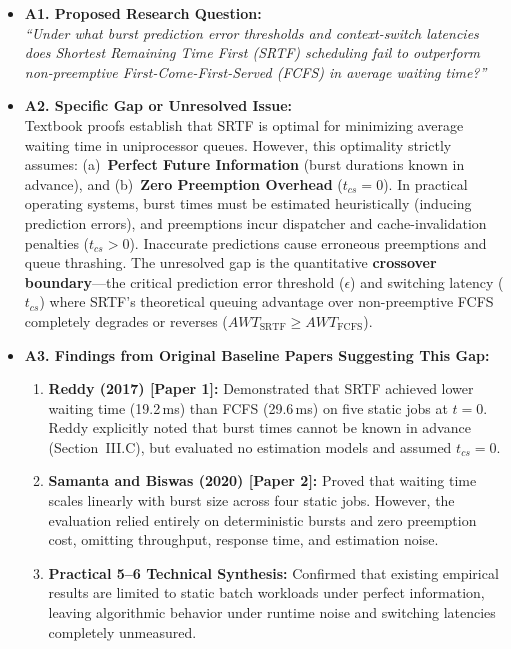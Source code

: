 \documentclass[11pt]{article}
\newcommand{\qLabel}[1]{
    {\fontsize{10}{12}\selectfont \textbf{#1}}
}
\begin{document}
\begin{itemize}[leftmargin=1.2em, itemsep=0.25em, parsep=0pt]

    \item \qLabel{A1. Proposed Research Question:} \\
    \textit{``Under what burst prediction error thresholds and context-switch latencies does Shortest Remaining Time First (SRTF) scheduling fail to outperform non-preemptive First-Come-First-Served (FCFS) in average waiting time?''}

    \item \qLabel{A2. Specific Gap or Unresolved Issue:} \\
    Textbook proofs establish that SRTF is optimal for minimizing average waiting time in uniprocessor queues. However, this optimality strictly assumes: (a)~\textbf{Perfect Future Information} (burst durations known in advance), and (b)~\textbf{Zero Preemption Overhead} ($t_{cs}=0$). In practical operating systems, burst times must be estimated heuristically (inducing prediction errors), and preemptions incur dispatcher and cache-invalidation penalties ($t_{cs} > 0$). Inaccurate predictions cause erroneous preemptions and queue thrashing. The unresolved gap is the quantitative \textbf{crossover boundary}---the critical prediction error threshold ($\epsilon$) and switching latency ($t_{cs}$) where SRTF's theoretical queuing advantage over non-preemptive FCFS completely degrades or reverses ($AWT_{\text{SRTF}} \ge AWT_{\text{FCFS}}$).

    \item \qLabel{A3. Findings from Original Baseline Papers Suggesting This Gap:}
    \begin{enumerate}[label=(\alph*), itemsep=0.1em, parsep=0pt]
        \item \textbf{Reddy (2017) [Paper 1]:} Demonstrated that SRTF achieved lower waiting time (19.2\,ms) than FCFS (29.6\,ms) on five static jobs at $t=0$. Reddy explicitly noted that burst times cannot be known in advance (Section~III.C), but evaluated no estimation models and assumed $t_{cs}=0$.
        \item \textbf{Samanta and Biswas (2020) [Paper 2]:} Proved that waiting time scales linearly with burst size across four static jobs. However, the evaluation relied entirely on deterministic bursts and zero preemption cost, omitting throughput, response time, and estimation noise.
        \item \textbf{Practical 5--6 Technical Synthesis:} Confirmed that existing empirical results are limited to static batch workloads under perfect information, leaving algorithmic behavior under runtime noise and switching latencies completely unmeasured.
    \end{enumerate}


\end{itemize}
\end{document}
